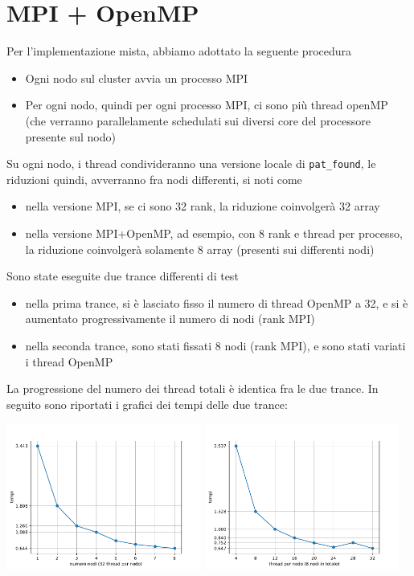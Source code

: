 \documentclass[12pt,openany]{report}
\begin{document}
\section{MPI + OpenMP}
Per l'implementazione mista, abbiamo adottato la seguente procedura\begin{itemize}
    \item Ogni nodo sul cluster avvia un processo MPI 
    \item Per ogni nodo, quindi per ogni processo MPI, ci sono più thread openMP (che verranno parallelamente schedulati sui diversi core del processore presente sul nodo)
\end{itemize}
Su ogni nodo, i thread condivideranno una versione locale di \texttt{pat\_found}, le riduzioni quindi, avverranno fra nodi differenti, si noti come \begin{itemize}
    \item nella versione MPI, se ci sono 32 rank, la riduzione coinvolgerà 32 array 
    \item nella versione MPI+OpenMP, ad esempio, con 8 rank e thread per processo, la riduzione coinvolgerà solamente 8 array (presenti sui differenti nodi)
\end{itemize}
Sono state eseguite due trance differenti di test\begin{itemize}
    \item nella prima trance, si è lasciato fisso il numero di thread OpenMP a 32, e si è aumentato progressivamente il numero di nodi (rank MPI)
    \item nella seconda trance, sono stati fissati 8 nodi (rank MPI), e sono stati variati i thread OpenMP
\end{itemize}
La progressione del numero dei thread totali è identica fra le due trance. In seguito sono riportati i grafici dei tempi delle due trance:
\begin{center}
    \includegraphics[width=0.48\textwidth ]{images/tempi_MISTO_M.pdf}
    \includegraphics[width=0.48\textwidth ]{images/tempi_MISTO_T.pdf}
\end{center}
\end{document}
